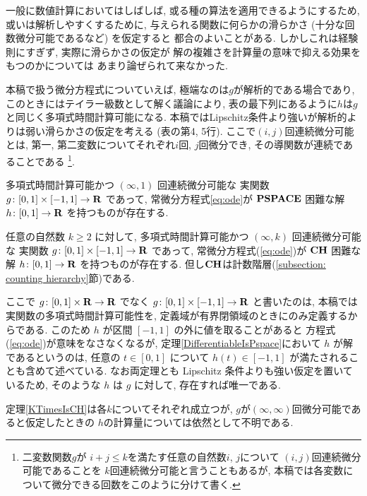 一般に数値計算においてはしばしば, 
或る種の算法を適用できるようにするため, 
或いは解析しやすくするために, 
与えられる関数に何らかの滑らかさ (十分な回数微分可能であるなど) を仮定すると
都合のよいことがある. 
しかしこれは経験則にすぎず, 
実際に滑らかさの仮定が
解の複雑さを計算量の意味で抑える効果をもつのかについては
あまり論ぜられて来なかった. 

本稿で扱う微分方程式についていえば, 
極端なのは$g$が解析的である場合であり, 
このときにはテイラー級数として解く議論により, 
表の最下列にあるように$h$は$g$と同じく多項式時間計算可能になる. 
本稿ではLipschitz条件より強いが解析的よりは弱い滑らかさの仮定を考える
(表の第4, 5行). 
ここで$(i, j)$回連続微分可能とは, 
第一, 第二変数についてそれぞれ$i$回, $j$回微分でき, 
その導関数が連続であることである
\footnote{%
二変数関数$g$が
$i+j \le k$を満たす任意の自然数$i$, $j$について
$(i,j)$回連続微分可能であることを
$k$回連続微分可能と言うこともあるが, 
本稿では各変数について微分できる回数をこのように分けて書く.}.

 \begin{theorem}
  \label{DifferentiableIsPspace}
  多項式時間計算可能かつ $(\infty, 1)$ 回連続微分可能な
  実関数 $g \colon [0,1] \times [-1,1] \to \mathbf R$ であって, 
  常微分方程式\eqref{eq:ode}が
  $\mathbf{PSPACE}$ 困難な解 $h \colon [0, 1] \to \mathbf R$ を持つものが存在する.
 \end{theorem}

 \begin{theorem}
  \label{KTimesIsCH}
  任意の自然数 $k \ge 2$ に対して, 
  多項式時間計算可能かつ $(\infty, k)$ 回連続微分可能な
  実関数 $g \colon [0,1] \times [-1,1] \to \mathbf R$ であって, 
  常微分方程式(\ref{eq:ode})が
  $\mathbf{CH}$ 困難な解 $h \colon [0, 1] \to \mathbf R$ を持つものが存在する.
但し$\mathbf{CH}$は計数階層(\ref{subsection: counting hierarchy}節)である.
 \end{theorem}

ここで $g \colon [0,1] \times \mathbf R \to \mathbf R$ でなく
$g \colon [0,1] \times [-1, 1] \to \mathbf R$ と書いたのは, 
本稿では実関数の多項式時間計算可能性を, 
定義域が有界閉領域のときにのみ定義するからである. 
このため $h$ が区間 $[-1, 1]$ の外に値を取ることがあると
方程式(\ref{eq:ode})が意味をなさなくなるが, 
定理\ref{DifferentiableIsPspace}において $h$ が解であるというのは, 
任意の $t \in [0, 1]$ について $h (t) \in [-1, 1]$ が満たされることも含めて述べている.
なお両定理とも Lipschitz 条件よりも強い仮定を置いているため, 
そのような $h$ は $g$ に対して, 存在すれば唯一である. 

定理\ref{KTimesIsCH}は各$k$についてそれぞれ成立つが, 
$g$が$(\infty, \infty)$回微分可能であると仮定したときの
$h$の計算量については依然として不明である. 

